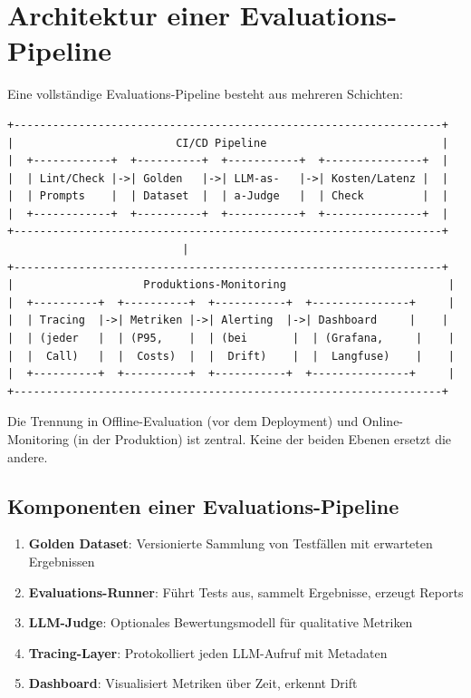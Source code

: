 \section{Architektur einer Evaluations-Pipeline}

Eine vollständige Evaluations-Pipeline besteht aus mehreren Schichten:

\begin{verbatim}
+------------------------------------------------------------------+
|                         CI/CD Pipeline                           |
|  +------------+  +----------+  +-----------+  +---------------+  |
|  | Lint/Check |->| Golden   |->| LLM-as-   |->| Kosten/Latenz |  |
|  | Prompts    |  | Dataset  |  | a-Judge   |  | Check         |  |
|  +------------+  +----------+  +-----------+  +---------------+  |
+------------------------------------------------------------------+
                           |
+------------------------------------------------------------------+
|                    Produktions-Monitoring                         |
|  +----------+  +----------+  +-----------+  +---------------+     |
|  | Tracing  |->| Metriken |->| Alerting  |->| Dashboard     |    |
|  | (jeder   |  | (P95,    |  | (bei       |  | (Grafana,     |    |
|  |  Call)   |  |  Costs)  |  |  Drift)    |  |  Langfuse)    |    |
|  +----------+  +----------+  +-----------+  +---------------+     |
+------------------------------------------------------------------+
\end{verbatim}

Die Trennung in Offline-Evaluation (vor dem Deployment) und Online-Monitoring (in der Produktion) ist zentral. Keine der beiden Ebenen ersetzt die andere.

\subsection{Komponenten einer Evaluations-Pipeline}

\begin{enumerate}[leftmargin=*]
    \item \textbf{Golden Dataset}: Versionierte Sammlung von Testfällen mit erwarteten Ergebnissen
    \item \textbf{Evaluations-Runner}: Führt Tests aus, sammelt Ergebnisse, erzeugt Reports
    \item \textbf{LLM-Judge}: Optionales Bewertungsmodell für qualitative Metriken
    \item \textbf{Tracing-Layer}: Protokolliert jeden LLM-Aufruf mit Metadaten
    \item \textbf{Dashboard}: Visualisiert Metriken über Zeit, erkennt Drift
\end{enumerate}

